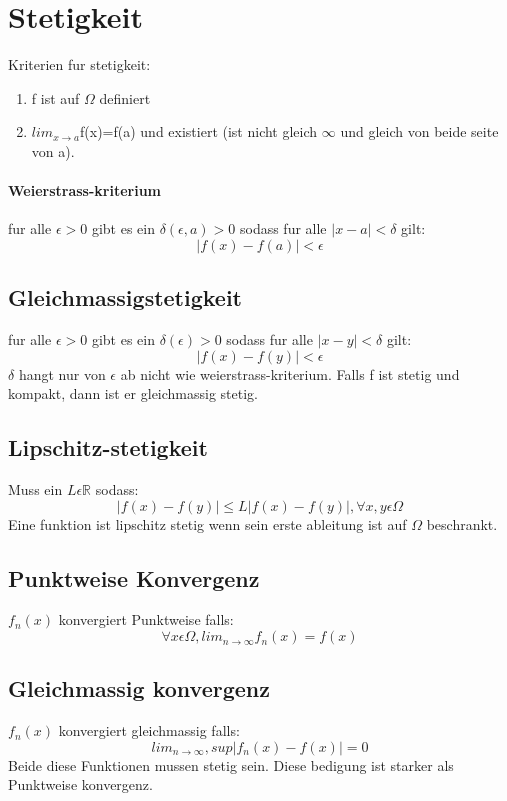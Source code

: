 \documentclass[11pt]{article}
\begin{document}
\section{Stetigkeit}
Kriterien fur stetigkeit:
\begin{enumerate}
	\item f ist auf $\Omega$ definiert
	\item $lim_{x\rightarrow a}$f(x)=f(a) und existiert (ist nicht gleich $\infty$ und gleich von beide seite von a).
\end{enumerate}
\paragraph{Weierstrass-kriterium}
fur alle $\epsilon > 0$ gibt es ein $\delta(\epsilon, a) >0$ sodass fur alle $|x-a|<\delta$ gilt:
\begin{equation*}
	|f(x) -f(a)|<\epsilon
\end{equation*}
\subsection{Gleichmassigstetigkeit}
fur alle $\epsilon > 0$ gibt es ein $\delta(\epsilon) >0$ sodass fur alle $|x-y|<\delta$ gilt:
\begin{equation*}
	|f(x)-f(y)| < \epsilon
\end{equation*}
$\delta$ hangt nur von $\epsilon$ ab nicht wie weierstrass-kriterium. Falls f ist stetig und kompakt, dann ist er gleichmassig stetig.

\subsection{Lipschitz-stetigkeit}
Muss ein $L\epsilon \mathbb{R}$ sodass:
\begin{equation*}
	|f(x)-f(y)|\leq L|f(x)-f(y)|, \forall x,y \epsilon \Omega
\end{equation*}
Eine funktion ist lipschitz stetig wenn sein erste ableitung ist auf $\Omega$ beschrankt.

\subsection{Punktweise Konvergenz}
$f_n(x)$ konvergiert Punktweise falls:
\begin{equation*}
	\forall x\epsilon \Omega, lim_{n\rightarrow\infty}f_n(x) = f(x)
\end{equation*}

\subsection{Gleichmassig konvergenz}
$f_n(x)$ konvergiert gleichmassig falls:
\begin{equation*}
	lim_{n\rightarrow\infty}, sup|f_n(x) - f(x)| = 0
\end{equation*}
Beide diese Funktionen mussen stetig sein.
Diese bedigung ist starker als Punktweise konvergenz.
\end{document}
